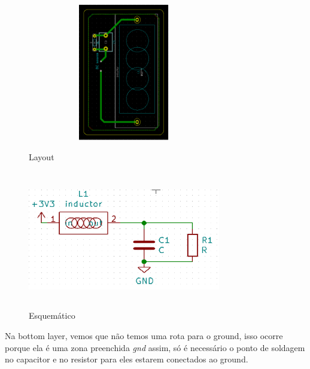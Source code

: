 \begin{figure}[!htb]
    \begin{minipage}{0.5\textwidth}
    \centering
    \includegraphics[height = 6cm,width = 0.75\textwidth]{PCB_3.png}
    \caption{Layout}
    \end{minipage}\hfill
    \begin{minipage}{0.5\textwidth}
    \centering
    \includegraphics[height = 6cm,width = 0.75\textwidth]{PCB_4.png}
    \caption{Esquemático}
    \end{minipage}\hfill
\end{figure}

\clearpage
Na bottom layer, vemos que não temos uma rota para o ground, isso ocorre porque ela é uma zona preenchida \textit{gnd} assim, só é necessário o ponto de soldagem no capacitor e no resistor para eles estarem conectados ao ground.

%
%

